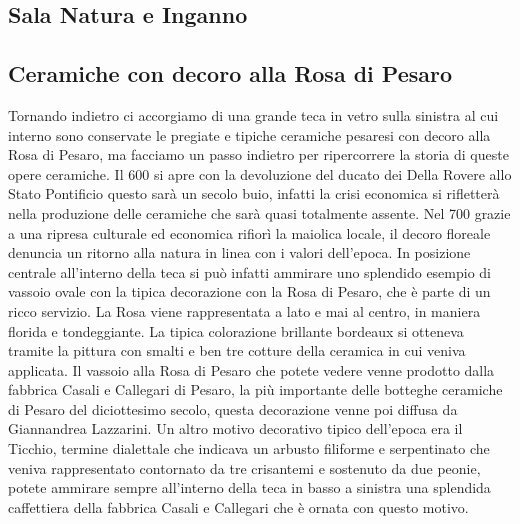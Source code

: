 \documentclass[hidelinks,12pt,a4paper]{article}
\begin{document}
\begin{flushleft}
			\section{Sala Natura e Inganno}
	
			\subsection{Ceramiche con decoro alla Rosa di Pesaro}
			Tornando indietro ci accorgiamo di una grande teca in vetro sulla sinistra al cui interno sono conservate le pregiate e tipiche ceramiche pesaresi con decoro alla Rosa di Pesaro, ma facciamo un passo indietro per ripercorrere la storia di queste opere ceramiche.
			Il 600 si apre con la devoluzione del ducato dei Della Rovere allo Stato Pontificio questo sarà un secolo buio, infatti la crisi economica si rifletterà nella produzione delle ceramiche che sarà quasi totalmente assente. Nel 700 grazie a una ripresa culturale ed economica rifiorì la maiolica locale, il decoro floreale denuncia un ritorno alla natura in linea con i valori dell'epoca. In posizione centrale all'interno della teca si può infatti ammirare uno splendido esempio di vassoio ovale con la tipica decorazione con la Rosa di Pesaro, che è parte di un ricco servizio. La Rosa viene rappresentata a lato e mai al centro, in maniera florida e tondeggiante. La tipica colorazione brillante bordeaux si otteneva tramite la pittura con smalti e ben tre cotture della ceramica in cui veniva applicata. Il vassoio alla Rosa di Pesaro che potete vedere venne prodotto dalla fabbrica Casali e Callegari di Pesaro, la più importante delle botteghe ceramiche di Pesaro del diciottesimo secolo, questa decorazione venne poi diffusa da Giannandrea Lazzarini. Un altro motivo decorativo tipico dell'epoca era il Ticchio, termine dialettale che indicava un arbusto filiforme e serpentinato che veniva rappresentato contornato da tre crisantemi e sostenuto da due peonie, potete ammirare sempre all'interno della teca in basso a sinistra una splendida caffettiera della fabbrica Casali e Callegari che è ornata con questo motivo.
	

\end{flushleft}
\end{document}
